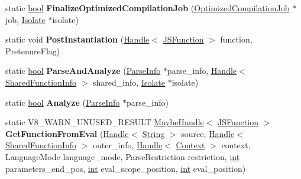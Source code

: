 \begin{DoxyCompactItemize}
\item 
\mbox{\label{classv8_1_1internal_1_1Compiler_a3ee205766255f2f39a0eeab07c4122bf}} 
static \mbox{\hyperlink{classbool}{bool}} {\bfseries Finalize\+Optimized\+Compilation\+Job} (\mbox{\hyperlink{classv8_1_1internal_1_1OptimizedCompilationJob}{Optimized\+Compilation\+Job}} $\ast$job, \mbox{\hyperlink{classv8_1_1internal_1_1Isolate}{Isolate}} $\ast$isolate)
\item 
\mbox{\label{classv8_1_1internal_1_1Compiler_a53477c5a6b447bb8e3b937d948f6d57a}} 
static void {\bfseries Post\+Instantiation} (\mbox{\hyperlink{classv8_1_1internal_1_1Handle}{Handle}}$<$ \mbox{\hyperlink{classv8_1_1internal_1_1JSFunction}{J\+S\+Function}} $>$ function, Pretenure\+Flag)
\item 
\mbox{\label{classv8_1_1internal_1_1Compiler_ad25c9c0a230918763f92d398ef2e7805}} 
static \mbox{\hyperlink{classbool}{bool}} {\bfseries Parse\+And\+Analyze} (\mbox{\hyperlink{classv8_1_1internal_1_1ParseInfo}{Parse\+Info}} $\ast$parse\+\_\+info, \mbox{\hyperlink{classv8_1_1internal_1_1Handle}{Handle}}$<$ \mbox{\hyperlink{classv8_1_1internal_1_1SharedFunctionInfo}{Shared\+Function\+Info}} $>$ shared\+\_\+info, \mbox{\hyperlink{classv8_1_1internal_1_1Isolate}{Isolate}} $\ast$isolate)
\item 
\mbox{\label{classv8_1_1internal_1_1Compiler_a833a9eb88b79466ef7450db27f3e99e8}} 
static \mbox{\hyperlink{classbool}{bool}} {\bfseries Analyze} (\mbox{\hyperlink{classv8_1_1internal_1_1ParseInfo}{Parse\+Info}} $\ast$parse\+\_\+info)
\item 
\mbox{\label{classv8_1_1internal_1_1Compiler_a09fe359c69b483ca308c9891f2de6bc6}} 
static V8\+\_\+\+W\+A\+R\+N\+\_\+\+U\+N\+U\+S\+E\+D\+\_\+\+R\+E\+S\+U\+LT \mbox{\hyperlink{classv8_1_1internal_1_1MaybeHandle}{Maybe\+Handle}}$<$ \mbox{\hyperlink{classv8_1_1internal_1_1JSFunction}{J\+S\+Function}} $>$ {\bfseries Get\+Function\+From\+Eval} (\mbox{\hyperlink{classv8_1_1internal_1_1Handle}{Handle}}$<$ \mbox{\hyperlink{classv8_1_1internal_1_1String}{String}} $>$ source, \mbox{\hyperlink{classv8_1_1internal_1_1Handle}{Handle}}$<$ \mbox{\hyperlink{classv8_1_1internal_1_1SharedFunctionInfo}{Shared\+Function\+Info}} $>$ outer\+\_\+info, \mbox{\hyperlink{classv8_1_1internal_1_1Handle}{Handle}}$<$ \mbox{\hyperlink{classv8_1_1internal_1_1Context}{Context}} $>$ context, Language\+Mode language\+\_\+mode, Parse\+Restriction restriction, \mbox{\hyperlink{classint}{int}} parameters\+\_\+end\+\_\+pos, \mbox{\hyperlink{classint}{int}} eval\+\_\+scope\+\_\+position, \mbox{\hyperlink{classint}{int}} eval\+\_\+position)

\end{DoxyCompactItemize}
